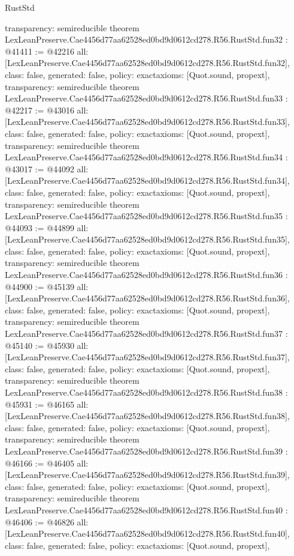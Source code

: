 \begin{lexlean}{RustStd}
\begin{coremodule}
{  transparency: semireducible
}
theorem LexLeanPreserve.Cae4456d77aa62528ed0bd9d0612cd278.R56.RustStd.fun32 : @41411 := @42216 {
  all: [LexLeanPreserve.Cae4456d77aa62528ed0bd9d0612cd278.R56.RustStd.fun32],
  class: false,
  generated: false,
  policy: exact{axioms: [Quot.sound, propext]},
  transparency: semireducible
}
theorem LexLeanPreserve.Cae4456d77aa62528ed0bd9d0612cd278.R56.RustStd.fun33 : @42217 := @43016 {
  all: [LexLeanPreserve.Cae4456d77aa62528ed0bd9d0612cd278.R56.RustStd.fun33],
  class: false,
  generated: false,
  policy: exact{axioms: [Quot.sound, propext]},
  transparency: semireducible
}
theorem LexLeanPreserve.Cae4456d77aa62528ed0bd9d0612cd278.R56.RustStd.fun34 : @43017 := @44092 {
  all: [LexLeanPreserve.Cae4456d77aa62528ed0bd9d0612cd278.R56.RustStd.fun34],
  class: false,
  generated: false,
  policy: exact{axioms: [Quot.sound, propext]},
  transparency: semireducible
}
theorem LexLeanPreserve.Cae4456d77aa62528ed0bd9d0612cd278.R56.RustStd.fun35 : @44093 := @44899 {
  all: [LexLeanPreserve.Cae4456d77aa62528ed0bd9d0612cd278.R56.RustStd.fun35],
  class: false,
  generated: false,
  policy: exact{axioms: [Quot.sound, propext]},
  transparency: semireducible
}
theorem LexLeanPreserve.Cae4456d77aa62528ed0bd9d0612cd278.R56.RustStd.fun36 : @44900 := @45139 {
  all: [LexLeanPreserve.Cae4456d77aa62528ed0bd9d0612cd278.R56.RustStd.fun36],
  class: false,
  generated: false,
  policy: exact{axioms: [Quot.sound, propext]},
  transparency: semireducible
}
theorem LexLeanPreserve.Cae4456d77aa62528ed0bd9d0612cd278.R56.RustStd.fun37 : @45140 := @45930 {
  all: [LexLeanPreserve.Cae4456d77aa62528ed0bd9d0612cd278.R56.RustStd.fun37],
  class: false,
  generated: false,
  policy: exact{axioms: [Quot.sound, propext]},
  transparency: semireducible
}
theorem LexLeanPreserve.Cae4456d77aa62528ed0bd9d0612cd278.R56.RustStd.fun38 : @45931 := @46165 {
  all: [LexLeanPreserve.Cae4456d77aa62528ed0bd9d0612cd278.R56.RustStd.fun38],
  class: false,
  generated: false,
  policy: exact{axioms: [Quot.sound, propext]},
  transparency: semireducible
}
theorem LexLeanPreserve.Cae4456d77aa62528ed0bd9d0612cd278.R56.RustStd.fun39 : @46166 := @46405 {
  all: [LexLeanPreserve.Cae4456d77aa62528ed0bd9d0612cd278.R56.RustStd.fun39],
  class: false,
  generated: false,
  policy: exact{axioms: [Quot.sound, propext]},
  transparency: semireducible
}
theorem LexLeanPreserve.Cae4456d77aa62528ed0bd9d0612cd278.R56.RustStd.fun40 : @46406 := @46826 {
  all: [LexLeanPreserve.Cae4456d77aa62528ed0bd9d0612cd278.R56.RustStd.fun40],
  class: false,
  generated: false,
  policy: exact{axioms: [Quot.sound, propext]},
}
\end{coremodule}
\end{lexlean}
